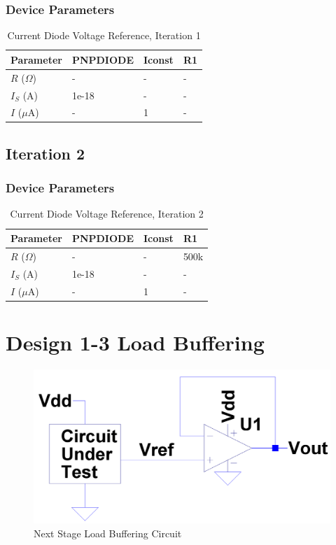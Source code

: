 \documentclass[conference]{IEEEtran}
\begin{document}
	\subsubsection{Device Parameters}
\begin{table}[!htbp]
  \caption[]{Current Diode Voltage Reference, Iteration 1}
  \label{tab:cm-dp-1}
  \centering
  \begin{tabular}{|l|l|l|l|}
    \hline
    Parameter			& PNPDIODE	&Iconst	&R1	\\ \hline
    $R$ ($\Omega$)		&-			&-	&- 	\\ \hline
    $I_S$ (A)		&1e-18			&-	&-	\\ \hline
    $I$ ($\mu$A)	&-				&1	&-	\\
    \hline
  \end{tabular}
\end{table}

\subsection{Iteration 2}
	\subsubsection{Device Parameters}
\begin{table}[!htbp]
  \caption[]{Current Diode Voltage Reference, Iteration 2}
  \label{tab:cm-dp-2}
  \centering
  \begin{tabular}{|l|l|l|l|}
    \hline
    Parameter			& PNPDIODE	&Iconst	&R1	\\ \hline
    $R$ ($\Omega$)		&-			&-	&500k 	\\ \hline
    $I_S$ (A)		&1e-18			&-	&-	\\ \hline
    $I$ ($\mu$A)	&-				&1	&-	\\
    \hline
  \end{tabular}
\end{table}

\section{Design 1-3 Load Buffering}
	\label{sec:Buff}

\begin{figure}[!htbp]
  	\centering
  	\includegraphics[scale=0.15]{images/loadbuff.png}
  	\caption[loadbuff]{Next Stage Load Buffering Circuit}
  	\label{fig:loadbuff}
	\end{figure}
\end{document}
